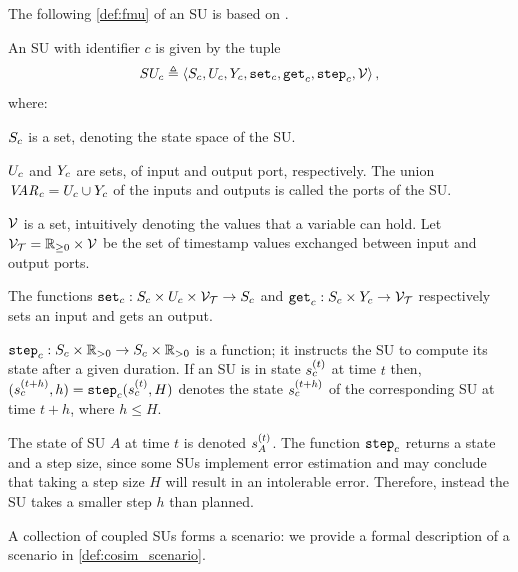 The following \cref{def:fmu} of an SU is based on \cite{Broman2013,Gomes2019c,thrane2021}.

\begin{definition}\label{def:fmu}
  An SU with identifier $c$ is given by the tuple
  $$ SU_c \triangleq  \left\langle S_{c}, U_{c}, Y_{c}, \mathtt{set}_{c}, \mathtt{get}_{c}, \mathtt{step}_{c}, \mathcal{V} \right\rangle ,$$
  where:
  \begin{compactitem}
    \item $S_{c}$ is a set, denoting the state space of the SU.
    \item $U_{c}$ and $Y_{c}$ are sets, of input and output port, respectively.
    The union $\mathit{VAR_{c}} = U_{c} \cup Y_{c}$ of the inputs and outputs is called the ports of the SU.
    \item $\mathcal{V}$ is a set, intuitively denoting the values that a variable can hold.
    Let $\mathcal{V_{T}} = \mathbb{R}_{\geq 0} \times \mathcal{V}$ be the set of timestamp values exchanged between input and output ports.
    \item 
    The functions
    $\mathtt{set}_{c} : S_{c} \times U_{c} \times \mathcal{V_{T}} \to S_{c}$ and $\mathtt{get}_{c}: S_{c} \times Y_{c} \to \mathcal{V_{T}}$ respectively sets an input and gets an output. 
    \item $\mathtt{step}_{c}: S_{c} \times \mathbb{R}_{> 0} \to S_{c} \times \mathbb{R}_{> 0} $ is a function; it instructs the SU to compute its state after a given duration. 
    If an SU is in state $s_{c}^{(t)}$ at time $t$ then, $(s_{c}^{(t+h)}, h) = \mathtt{step}_{c}(s_{c}^{(t)}, H)$ denotes the state $s_{c}^{(t+h)}$ of the corresponding SU at time $t+h$, where $h \leq H$. 
  \end{compactitem}
\end{definition}

The state of SU $A$ at time $t$ is denoted $s_{A}^{(t)}$.
The function $\mathtt{step}_{c}$ returns a state and a step size, since some SUs implement error estimation and may conclude that taking a step size $H$ will result in an intolerable error.
Therefore, instead the SU takes a smaller step $h$ than planned.

A collection of coupled SUs forms a scenario:
we provide a formal description of a scenario in \cref{def:cosim_scenario}.

